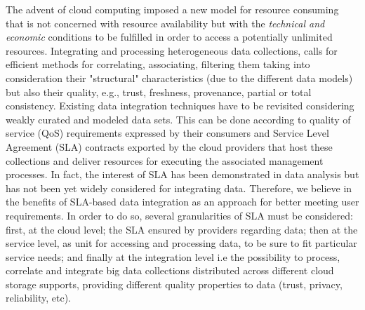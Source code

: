 %


\color{black}
The advent of cloud computing imposed a new model for resource consuming that is not concerned
 with resource availability but with the \textit{technical and economic} conditions to be fulfilled in order to access a potentially unlimited resources. Integrating and processing heterogeneous data collections, calls for efficient methods for correlating, associating, filtering them taking into consideration their "structural" characteristics (due to the different data models) but also their quality, e.g., trust, freshness, provenance, partial or total consistency. 
Existing data integration techniques have to be revisited considering weakly curated and modeled data sets. This can be done according to quality of service (QoS) requirements expressed by their consumers and Service Level Agreement (SLA) contracts exported by the cloud providers that host  these collections and deliver resources for executing the associated management processes.
In fact,  the interest of SLA has been demonstrated  in data analysis but has not been yet widely considered for integrating data. Therefore, we believe in the benefits of SLA-based data integration as an approach for better meeting  user requirements.
\color{red}
In order to do so, several granularities of SLA must be considered: first, at the cloud level; the SLA ensured by providers regarding data; then at the service level, as unit for accessing and processing data, to be sure to fit particular service needs; and finally at the integration level i.e the possibility to process, correlate and integrate big data collections distributed across different cloud storage supports, providing different quality properties to data (trust, privacy, reliability, etc).


\color{black}

